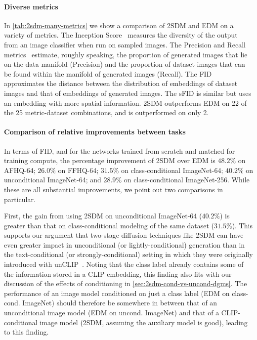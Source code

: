 \paragraph{Diverse metrics}
In \cref{tab:2sdm-many-metrics} we show a comparison of 2SDM and EDM on a variety of metrics. The Inception Score~\citep{salimans2016improved,barratt2018note} measures the diversity of the output from an image classifier when run on sampled images. The Precision and Recall metrics~\citep{kynkaanniemi2019improved} estimate, roughly speaking, the proportion of generated images that lie on the data manifold (Precision) and the proportion of dataset images that can be found within the manifold of generated images (Recall). The FID approximates the distance between the distribution of embeddings of dataset images and that of embeddings of generated images. The sFID is similar but uses an embedding with more spatial information. 2SDM outperforms EDM on 22 of the 25 metric-dataset combinations, and is outperformed on only 2.

\paragraph{Comparison of relative improvements between tasks}
In terms of FID, and for the networks trained from scratch and matched for training compute, the percentage improvement of 2SDM over EDM is $48.2\%$ on AFHQ-64; $26.0\%$ on FFHQ-64; $31.5\%$ on class-conditional ImageNet-64; $40.2\%$ on unconditional ImageNet-64; and $28.9\%$ on class-conditional ImageNet-256. While these are all substantial improvements, we point out two comparisons in particular. 

First, the gain from using 2SDM on unconditional ImageNet-64 ($40.2\%$) is greater than that on class-conditional modeling of the same dataset ($31.5\%$). This supports our argument that two-stage diffusion techniques like 2SDM can have even greater impact in unconditional (or lightly-conditional) generation than in the text-conditional (or strongly-conditional) setting in which they were originally introduced with unCLIP~\citep{ramesh2022hierarchical}.  Noting that the class label already contains some of the information stored in a CLIP embedding, this finding also fits with our discussion of the effects of conditioning in \cref{sec:2sdm-cond-vs-uncond-dgms}. The performance of an image model conditioned on just a class label (EDM on class-cond. ImageNet) should therefore be somewhere in between that of an unconditional image model (EDM on uncond. ImageNet) and that of a CLIP-conditional image model (2SDM, assuming the auxiliary model is good), leading to this finding.

